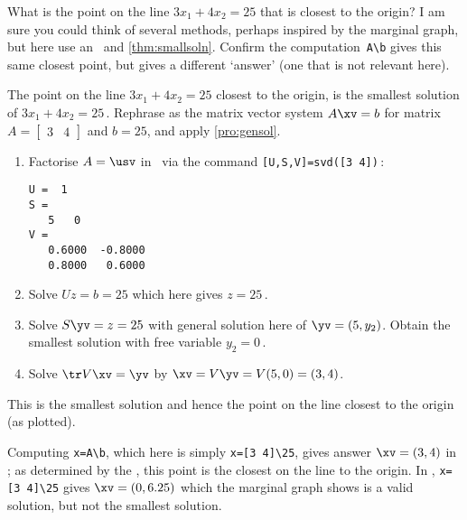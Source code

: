 \begin{example} \label{eg:}
What is the point on the line \(3x_1+4x_2=25\) that is closest to the origin?
I am sure you could think of several methods, perhaps inspired by the marginal graph, but here use an \svd\ and \autoref{thm:smallsoln}.
Confirm the \script[2] computation~\verb|A\b| gives this same closest point, but \script[1] gives a different `answer' (one that is not relevant here).
\begin{solution} 
The point on the line \(3x_1+4x_2=25\) closest to the origin, is the smallest solution of \(3x_1+4x_2=25\)\,.  
Rephrase as the matrix vector system \(A\xv=b\) for matrix \(A=\begin{bmatrix} 3&4 \end{bmatrix}\) and \(b=25\), and apply \autoref{pro:gensol}.
\begin{enumerate}
\item Factorise \(A=\usv\) in \script\ via the command \verb|[U,S,V]=svd([3 4])|\,:
\begin{verbatim}
U =  1
S =
   5   0
V =
   0.6000  -0.8000
   0.8000   0.6000
\end{verbatim}
\item Solve \(Uz=b=25\) which here gives \(z=25\)\,.
\item Solve \(S\yv=z=25\) with general solution here of \(\yv=(5,y_2)\). 
Obtain the smallest solution with free variable \(y_2=0\)\,.
\item Solve \(\tr V\xv=\yv\) by \(\xv=V\yv=V(5,0)=(3,4)\).  
\end{enumerate}
This is the smallest solution and hence the point on the line closest to the origin (as plotted).

Computing \verb|x=A\b|, which here is simply \verb|x=[3 4]\25|, gives answer \(\xv=(3,4)\) in \script[2]; as determined by the \svd, this point is the closest on the line to the origin.
In \script[1], \verb|x=[3 4]\25| gives \(\xv=(0,6.25)\) which the marginal graph shows is a valid solution, but not the smallest solution.
\end{solution}
\end{example}




